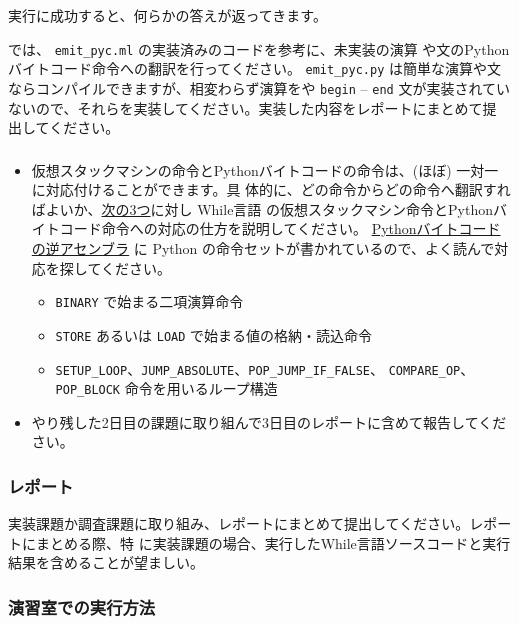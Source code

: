 \documentclass[a4paper,11pt]{jsarticle}
\begin{document}
実行に成功すると、何らかの答えが返ってきます。

では、 \verb|emit_pyc.ml| の実装済みのコードを参考に、未実装の演算
や文のPythonバイトコード命令への翻訳を行ってください。
\verb|emit_pyc.py| は簡単な演算や文ならコンパイルできますが、相変わらず演算をや \verb|begin| --
\verb|end| 文が実装されていないので、それらを実装してください。実装した内容をレポートにまとめて提
出してください。

\subsubsection{}

\begin{itemize}
\item 仮想スタックマシンの命令とPythonバイトコードの命令は、(ほぼ) 一対一に対応付けることができます。具
  体的に、どの命令からどの命令へ翻訳すればよいか、\underline{次の3つ}に対し While言語
  の仮想スタックマシン命令とPythonバイトコード命令への対応の仕方を説明してください。
  \href{https://docs.python.org/ja/2.7/library/dis.html}{Pythonバイトコードの逆アセンブラ}
  に Python の命令セットが書かれているので、よく読んで対応を探してください。
  \begin{itemize}
  \item \verb|BINARY| で始まる二項演算命令
  \item \verb|STORE| あるいは \verb|LOAD| で始まる値の格納・読込命令
  \item \verb|SETUP_LOOP|、\verb|JUMP_ABSOLUTE|、\verb|POP_JUMP_IF_FALSE|、
    \verb|COMPARE_OP|、\verb|POP_BLOCK| 命令を用いるループ構造
  \end{itemize}
\item やり残した2日目の課題に取り組んで3日目のレポートに含めて報告してください。
\end{itemize}

\subsubsection{レポート}

実装課題か調査課題に取り組み、レポートにまとめて提出してください。レポートにまとめる際、特
に実装課題の場合、実行したWhile言語ソースコードと実行結果を含めることが望ましい。

\subsubsection{演習室での実行方法}
\end{document}
